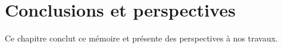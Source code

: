 \chapter{Conclusions et perspectives}
\label{chapter:conclusions}

\mminitoc

Ce chapitre conclut ce mémoire et présente des perspectives à nos travaux.

